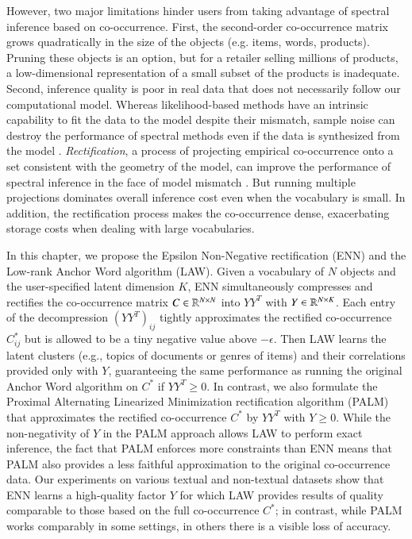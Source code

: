 However, two major limitations hinder users from taking advantage of spectral
inference based on co\hyp{}occurrence. First, the second\hyp{}order 
co\hyp{}occurrence matrix grows quadratically in the size of the objects (e.g.
items, words, products). Pruning these objects is an option, but for a retailer
selling millions of products, a low\hyp{}dimensional representation of a small
subset of the products is inadequate. Second, inference quality is poor in real
data that does not necessarily follow our computational model. Whereas
likelihood\hyp{}based methods have an intrinsic capability to fit the data to
the model despite their mismatch, sample noise can destroy the  performance of
spectral methods even if the data is synthesized from the model 
\cite{kulesza2014low}. {\em Rectification}, a process of projecting empirical 
co\hyp{}occurrence onto a set consistent with the geometry of the model, can
improve the performance of spectral inference in the face of model mismatch 
\cite{moontae2015nips}. But running multiple projections dominates overall
inference cost even when the vocabulary is small. In addition, the rectification
process makes the co\hyp{}occurrence dense, exacerbating storage costs when
dealing with large vocabularies.

In this chapter, we propose the Epsilon Non\hyp{}Negative rectification (ENN)
and the Low\hyp{}rank Anchor Word algorithm (LAW). Given a vocabulary of $N$
objects and the user\hyp{}specified latent dimension $K$, ENN simultaneously
compresses and rectifies the co\hyp{}occurrence matrix $C \in \mathbb{R}^{N \mathbin{\times}
N}$ into $YY^T$ with $Y \in \mathbb{R}^{N \mathbin{\times} K}$. Each entry of the decompression
$(YY^T)_{ij}$ tightly approximates the rectified co\hyp{}occurrence $C^*_{ij}$ 
but is allowed to be a tiny negative value above $-\epsilon$. Then LAW learns
the latent clusters (e.g., topics of documents or genres of items) and their
correlations provided only with $Y$, guaranteeing the same performance as
running the original Anchor Word algorithm on $C^*$ if $YY^T \geq 0$. In
contrast, we also formulate the Proximal Alternating Linearized Minimization 
rectification algorithm (PALM) that approximates the rectified 
co\hyp{}occurrence $C^*$ by $YY^T$ with $Y \geq 0$. While the
non\hyp{}negativity of $Y$ in the PALM approach allows LAW to perform exact
inference, the fact that PALM enforces more constraints than ENN means that PALM
also provides a less faithful approximation to the original co\hyp{}occurrence
data. Our experiments on various textual and non\hyp{}textual datasets show that
ENN learns a high\hyp{}quality factor $Y$ for which LAW provides results of
quality comparable to those based on the full co\hyp{}occurrence $C^*$; in
contrast, while PALM works comparably in some settings, in others there is a
visible loss of accuracy.


